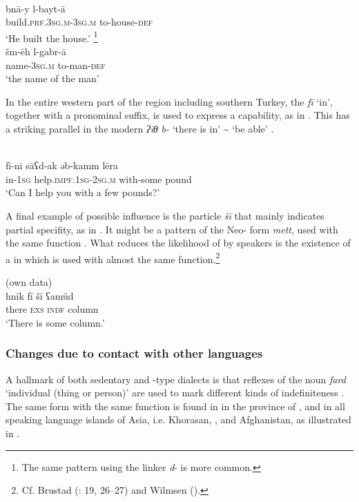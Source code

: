 \documentclass[output=paper]{langsci/langscibook}
\begin{document}
\ea \label{rubin}
\ea
{ \citep[100]{Rubin2005}}\\
\gll bnā-y l-bayt-ā\\
     build.\textsc{prf.3sg.m}{}-3\textsc{sg.m} to-house-\textsc{def}\\
     \glt ‘He built the house.’
\ex
{  \citep[29]{Hopkins1997}\footnote{The same pattern using the linker \textit{d}{}- is more common.}}\\
\gll šm-ēh l-gabr-ā\\
     name-3\textsc{sg.m} to-man-\textsc{def}\\
\glt ‘the name of the man’
\z
\z

In the entire western part of the region including southern Turkey, the  \textit{fī} ‘in’, together with a pronominal suffix, is used to express a capability, as in . This has a striking parallel in the modern  \textit{ʔīθ} \textit{b-} ‘there is in' {\textasciitilde} `be able’ \citep[52]{Borg2004}.

\ea \label{cowell}
{ \citep[415]{Cowell1964}} \\
\gll fī-ni sāʕd-ak əb-kamm lēra\\
     in-\textsc{1sg} help.\textsc{impf.1sg-2sg.m} with-some pound \\
\glt ‘Can I help you with a few pounds?’
\z

A final example of possible  influence is the  particle \textit{šī} that mainly indicates partial specifity, as in . It might be a pattern  of the  Neo- form \textit{mett}, used with the same function \citep[49]{Diem1979}. What reduces the likelihood of  by  speakers is the existence of a  in   which is used with almost the same function.\footnote{Cf. Brustad (\citeyear{Brustad2000}: 19, 26--27) and Wilmsen (\citeyear[51--53]{Wilmsen2014}).}

\ea\label{shi} 
{ (own data)}\\
\gll hnīk fī šī ʕamūd\\
     there \textsc{exs} \textsc{indf} column \\
\glt ‘There is some column.’
\z

\subsubsection{Changes due to contact with other languages}
A hallmark of both sedentary and -type  dialects is that reflexes of the noun \textit{fard} ‘individual (thing or person)’ are used to mark different kinds of indefiniteness \citep[118--119]{Blanc1964}. The same form with the same  function is found in in the  province of , and in all  speaking language islands of  Asia, i.e. Khorasan, , and Afghanistan, as illustrated in .
\end{document}
